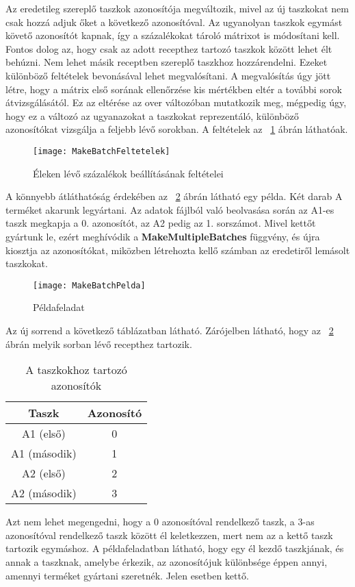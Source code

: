 Az eredetileg szereplő taszkok azonosítója megváltozik, mivel az új taszkokat nem csak hozzá adjuk őket a következő azonosítóval. Az ugyanolyan taszkok egymást követő azonosítót kapnak, így a százalékokat tároló mátrixot is módosítani kell. Fontos dolog az, hogy csak az adott recepthez tartozó taszkok között lehet élt behúzni. Nem lehet másik receptben szereplő taszkhoz hozzárendelni. Ezeket különböző feltételek bevonásával lehet megvalósítani. A megvalósítás úgy jött létre, hogy a mátrix  első sorának ellenőrzése kis mértékben eltér a további sorok átvizsgálásától. Ez az eltérése az over változóban mutatkozik meg, mégpedig úgy, hogy ez a változó az ugyanazokat a taszkokat reprezentáló, különböző azonosítókat vizsgálja a feljebb lévő sorokban. A feltételek az ~\ref{MakeBatchFeltetelek} ábrán láthatóak.
\begin{figure}[H]
\begin{center}
\texttt{[image: MakeBatchFeltetelek]}
\caption{Éleken lévő százalékok beállításának feltételei}
\label{MakeBatchFeltetelek}
\end{center}
\end{figure}
A könnyebb átláthatóság érdekében az ~\ref{MakeBatchPelda} ábrán látható egy példa. Két darab A terméket akarunk legyártani. Az adatok fájlból való beolvasása során az A1-es taszk megkapja a 0. azonosítót, az A2 pedig az 1. sorszámot. Mivel kettőt gyártunk le, ezért meghívódik a \textbf{MakeMultipleBatches} függvény, és újra kiosztja az azonosítókat, miközben létrehozta kellő számban az eredetiről lemásolt taszkokat. 
\begin{figure}[H]
\begin{center}
\texttt{[image: MakeBatchPelda]}
\caption{Példafeladat}
\label{MakeBatchPelda}
\end{center}
\end{figure}
Az új sorrend a következő táblázatban látható. Zárójelben látható, hogy az ~\ref{MakeBatchPelda} ábrán melyik sorban lévő recepthez tartozik.
\begin{table}[H]
  \begin{center}
  	\caption{A taszkokhoz tartozó azonosítók}
  	\captionsetup[table]{skip=10pt}
    \label{tab:table1}
    \begin{tabular}{|c|c|}
      \textbf{Taszk} & \textbf{Azonosító} \\     
      \hline
      A1 (első) & 0\\
      A1 (második) & 1\\
      A2 (első) & 2\\
      A2 (második) & 3\\
    \end{tabular}
  \end{center}
\end{table}
Azt nem lehet megengedni, hogy a 0 azonosítóval rendelkező taszk, a 3-as azonosítóval rendelkező taszk között él keletkezzen, mert nem az a kettő taszk tartozik egymáshoz. A példafeladatban látható, hogy egy él kezdő taszkjának, és annak a taszknak, amelybe érkezik, az azonosítójuk különbsége éppen annyi, amennyi terméket gyártani szeretnék. Jelen esetben kettő. 


